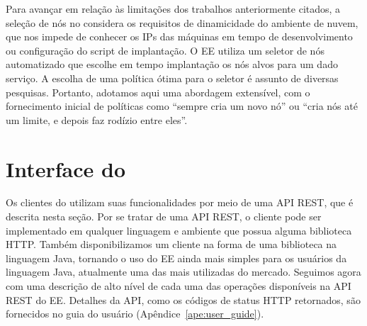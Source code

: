 Para avançar em relação às limitações dos trabalhos anteriormente citados, 
a seleção de nós no \ee
considera os requisitos de dinamicidade do ambiente de nuvem, que nos impede de conhecer os IPs das máquinas 
em tempo de desenvolvimento ou configuração do script de implantação.
O EE utiliza um seletor de nós automatizado que escolhe em tempo implantação os nós alvos para um dado serviço.
A escolha de uma política ótima para o seletor é assunto de diversas pesquisas.
Portanto, adotamos aqui uma abordagem extensível, com o fornecimento inicial de políticas como
``sempre cria um novo nó'' ou ``cria nós até um limite, e depois faz rodízio entre eles''.

\section{Interface do \ee}
\label{sec:interface}

Os clientes do \ee utilizam suas funcionalidades por meio de uma API REST, que é descrita nesta seção. 
Por se tratar de uma API REST, o cliente pode ser implementado em qualquer linguagem 
e ambiente que possua alguma biblioteca HTTP. 
Também disponibilizamos um cliente na forma de uma biblioteca na linguagem Java, 
tornando o uso do EE ainda mais simples para os usuários da linguagem Java, 
atualmente uma das mais utilizadas do mercado. 
Seguimos agora com uma descrição de alto nível de cada uma das operações disponíveis 
na API REST do EE. Detalhes da API, como os códigos de status HTTP retornados, 
são fornecidos no guia do usuário (Apêndice~\ref{ape:user_guide}).

